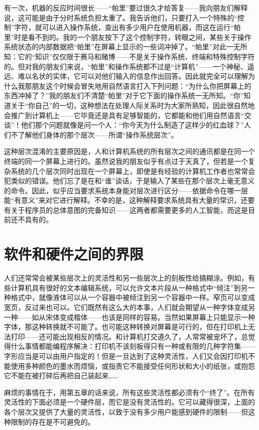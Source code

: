 有一次，机器的反应时间很长——“帕里”要过很久才给答复——我向朋友们解释说，这可能是由于分时系统负担太重了。我告诉他们，只要打入一个特殊的“控制”字符，就可以进入操作系统，查出有多少用户在使用机器，而这在运行“帕里”时是看不到的。我的一个朋友按下了这个控制字符，转眼之间，某些关于操作系统状态的内部数据把“帕里”在屏幕上显示的一些词冲掉了。“帕里”对此一无所知：它的“知识”仅仅限于赛马和赌博——不是关于操作系统、终端和特殊控制字符的。但对我的朋友们来说，“帕里”和操作系统都不过是“计算机”——一个神秘、遥远、难以名状的实体，它可以对他们输入的信息作出回答。因此就完全可以理解为什么我那朋友这个时候会冒失地用自然语言打入下列问题：“为什么你把屏幕上的东西冲掉了？”我的朋友们不清楚“帕里”对于它下面的操作系统一无所知。“你”知道关于“你自己”的一切，这种想法在处理人际关系时为大家所熟知，因此很自然地会推广到计算机上——它毕竟还是具有足够智能的，它都能和他们用自然语言“交谈”！他们那个问题就像是问一个人：“你今天为什么制造了这样少的红血球？”人们不了解他们身体的那个层次——所谓“操作系统层次”。

这种层次混淆的主要原因是，人和计算机系统的所有层次之间的通讯都是在同一个终端的同一个屏幕上进行的。虽然说我的朋友似乎有点过于天真了，但若是一个复杂系统的几个层次同时出现在一个屏幕上，即使是有经验的计算机工作者也常常会犯类似的错误。他们忘了是在和“谁”谈话，于是输入了某些在那个层次上毫无意义的命令。因此，似乎应当要求系统本身能对层次进行区分——依据命令在哪一层能“有意义”来对它进行解释。不幸的是，这种解释要求系统具有大量的常识，还要有关于程序员的总体意图的完备知识——这两者都需要更多的人工智能，而这是目前还不具有的。

\section{软件和硬件之间的界限}

人们还常常会被某些层次上的灵活性和另一些层次上的刻板性给搞糊涂。例如，有些计算机具有很好的文本编辑系统，可以允许文本片段从一种格式中“倾注”到另一种格式中，就像液体可以从一个容器中被倾注到另一个容器中一样。窄页可以变成宽页，反过来也可以。它们既然有这么大的本事，人们就会期望从一种字体变成另一种——如从宋体变成楷体——也该是同样的容易。当然如果屏幕上只能显示一种字体，那这种转换就不可能了。也可能这种转换对屏幕是可行的，但在打印机上无法打印——还可能出现相反的情况。和计算机打交道久了，人常常被宠坏了，总觉得什么事情都能编程序解决：打印机不该刻板得只有一种或有限的几种字符集——字形应当是可以由用户指定的！但是一旦达到了这种灵活性，人们又会因打印机不能使用多种颜色的墨水而烦恼，或指责它不能接受任何形状和大小的纸张，或抱怨它不能在被打碎后再把自己装起来……

麻烦的事情在于，用第五章的话来说，所有这些灵活性都必须有个“终了”。在所有灵活性的下面必须是一个硬件层，而它是没有灵活性的。它可以藏得很深，上面的各个层次又提供了大量的灵活性，以致于没有多少用户能感到硬件的限制——但这种限制的存在是不可避免的。

